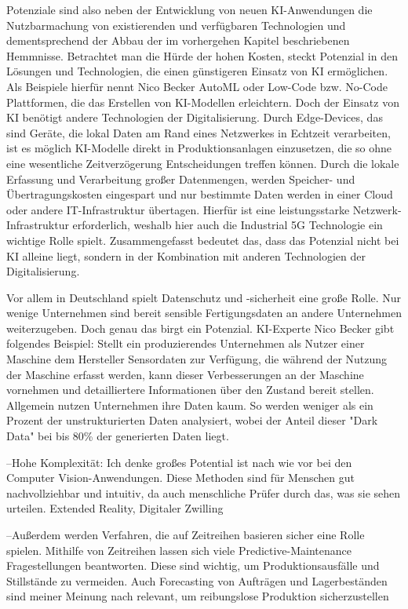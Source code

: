 \documentclass[a4paper,12pt, german]{report}
\begin{document}
Potenziale sind also neben der Entwicklung von neuen KI-Anwendungen die Nutzbarmachung von existierenden und verfügbaren Technologien und dementsprechend der Abbau der im vorhergehen Kapitel beschriebenen Hemmnisse. Betrachtet man die Hürde der hohen Kosten, steckt Potenzial in den Lösungen und Technologien, die einen günstigeren Einsatz von KI ermöglichen. Als Beispiele hierfür nennt Nico Becker AutoML oder Low-Code bzw. No-Code Plattformen, die das Erstellen von KI-Modellen erleichtern. Doch der Einsatz von KI benötigt andere Technologien der Digitalisierung. Durch Edge-Devices, das sind Geräte, die lokal Daten am Rand eines Netzwerkes in Echtzeit verarbeiten, ist es möglich KI-Modelle direkt in Produktionsanlagen einzusetzen, die so ohne eine wesentliche Zeitverzögerung Entscheidungen treffen können. Durch die lokale Erfassung und Verarbeitung großer Datenmengen, werden Speicher- und Übertragungskosten eingespart und nur bestimmte Daten werden in einer Cloud oder andere IT-Infrastruktur übertagen. Hierfür ist eine leistungsstarke Netzwerk-Infrastruktur erforderlich, weshalb hier auch die Industrial 5G Technologie ein wichtige Rolle spielt.\cite{36} Zusammengefasst bedeutet das, dass das Potenzial nicht bei KI alleine liegt, sondern in der Kombination mit anderen Technologien der Digitalisierung.

Vor allem in Deutschland spielt Datenschutz und -sicherheit eine große Rolle. Nur wenige Unternehmen sind bereit sensible Fertigungsdaten an andere Unternehmen weiterzugeben. Doch genau das birgt ein Potenzial. KI-Experte Nico Becker gibt folgendes Beispiel: Stellt ein produzierendes Unternehmen als Nutzer einer Maschine dem Hersteller Sensordaten zur Verfügung, die während der Nutzung der Maschine erfasst werden, kann dieser Verbesserungen an der Maschine vornehmen und detailliertere Informationen über den Zustand bereit stellen.\newline
Allgemein nutzen Unternehmen ihre Daten kaum. So werden weniger als ein Prozent der unstrukturierten Daten analysiert, wobei der Anteil dieser "Dark Data" bei bis 80\% der generierten Daten liegt.\cite{36}




--Hohe Komplexität: Ich denke großes Potential ist nach wie vor bei den Computer Vision-Anwendungen. Diese Methoden sind für Menschen gut nachvollziehbar und intuitiv, da auch menschliche Prüfer durch das, was sie sehen urteilen. 
Extended Reality, Digitaler Zwilling

--Außerdem werden Verfahren, die auf Zeitreihen basieren sicher eine Rolle spielen. Mithilfe von Zeitreihen lassen sich viele Predictive-Maintenance Fragestellungen beantworten. Diese sind wichtig, um Produktionsausfälle und Stillstände zu vermeiden. Auch Forecasting von Aufträgen und Lagerbeständen sind meiner Meinung nach relevant, um reibungslose Produktion sicherzustellen
\end{document}
